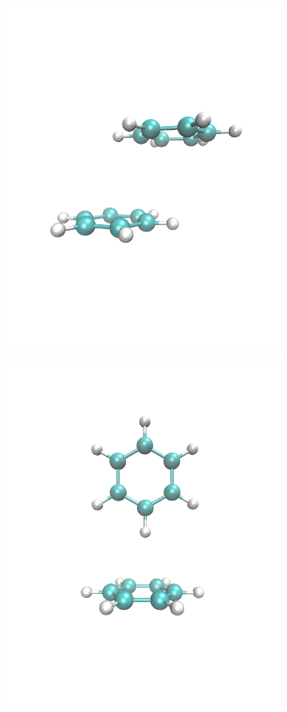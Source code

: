 \documentclass{article}
\begin{document}
\begin{figure}
\begin{subfigure}[b]{0.32\textwidth}
		\includegraphics[width=\textwidth]{PD.png}
		\caption{}\label{fig:pd}
	\end{subfigure}
	\begin{subfigure}[b]{0.32\textwidth}
		\centering
		\includegraphics[width=\textwidth]{Tshaped.png}

\end{subfigure}
\end{figure}
\end{document}
